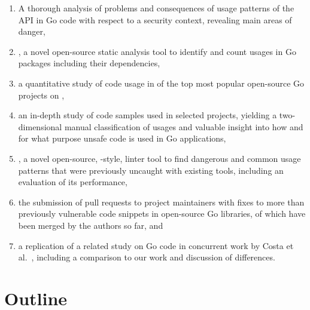 \begin{enumerate}
    \item A thorough analysis of problems and consequences of usage patterns of the \unsafe{} \acrshort{API} in Go code
    with respect to a security context, revealing  main areas of danger,

    \item \toolGeiger, a novel open-source static analysis tool to identify and count \unsafe{} usages in Go packages
    including their dependencies,

    \item a quantitative study of \unsafe{} code usage in \projsAnalyzed{} of the top \projsTotal{} most popular
    open-source Go projects on \github{},

    \item an in-depth study of \numberLabeledCodeSnippets{} code samples used in \projsForLabeledCodeSnippets{} selected
    projects, yielding a two-dimensional manual classification of usages and valuable insight into how and for what
    purpose unsafe code is used in Go applications,

    \item \toolSafer{}, a novel open-source, \toolVet{}-style, linter tool to find  dangerous and common
    \unsafe{} usage patterns that were previously uncaught with existing tools, including an evaluation of its
    performance,

    \item the submission of \numberPRs{} pull requests to project maintainers with fixes to more than
    \numberBugsFixedRounded{} previously vulnerable code snippets in open-source Go libraries, \numberPRsMerged{} of
    which have been merged by the authors so far, and

    \item a replication of a related study on \unsafe{} Go code in concurrent work by Costa et al.~\cite{costa2020},
    including a comparison to our work and discussion of differences.
\end{enumerate}



\section{Outline}\label{sec:introduction:outline}

